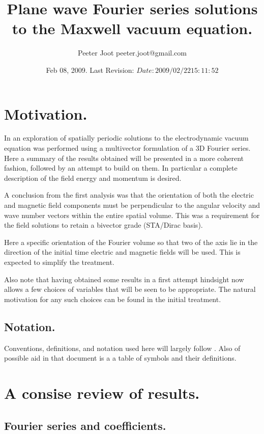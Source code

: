 \documentclass{article}
\title{ Plane wave Fourier series solutions to the Maxwell vacuum equation. }
\author{Peeter Joot \quad peeter.joot@gmail.com}
\date{ Feb 08, 2009.  Last Revision: $Date: 2009/02/22 15:11:52 $ }
\begin{document}
\maketitle{}
\tableofcontents

\section{ Motivation. }

In \cite{PJFourierVacuum} an exploration of spatially periodic solutions to the electrodynamic vacuum equation was performed using a multivector formulation
of a 3D Fourier series.
Here a summary of the results obtained will be presented in a more
coherent fashion, followed by an attempt to build on them.
In particular a complete
description of the field energy and momentum is desired.

A conclusion from the first analysis was that the
orientation of both the electric and magnetic field components
must be perpendicular to the angular velocity and wave number vectors
within the entire spatial volume.  This was a requirement for the field
solutions to retain a bivector grade (STA/Dirac basis).

Here a specific orientation of the Fourier volume so that two of the axis
lie in the direction of the initial time electric and magnetic fields will be
used.  This is expected to simplify the treatment.

Also note that having obtained some results in a first attempt hindsight
now allows a few choices of variables that will be seen to be appropriate.
The natural motivation for any such choices can be found in the initial
treatment.

\subsection{ Notation. }

Conventions, definitions, and notation used here will largely follow
\cite{PJFourierVacuum}.  Also of possible aid in that document is a
a table of symbols and their definitions.

\section{ A consise review of results. }

\subsection{ Fourier series and coefficients. }
\end{document}
